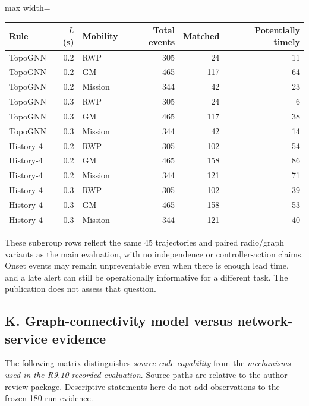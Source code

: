 \documentclass[10pt,a4paper]{article}
\begin{document}
\begin{center}
\small
\setlength{\tabcolsep}{5pt}
\begin{adjustbox}{max width=\linewidth}\begin{tabular}{lrlrrr}
\toprule
Rule & $L$ (s) & Mobility & Total events & Matched & Potentially timely \\
\midrule
TopoGNN & 0.2 & RWP & 305 & 24 & 11 \\
TopoGNN & 0.2 & GM & 465 & 117 & 64 \\
TopoGNN & 0.2 & Mission & 344 & 42 & 23 \\
TopoGNN & 0.3 & RWP & 305 & 24 & 6 \\
TopoGNN & 0.3 & GM & 465 & 117 & 38 \\
TopoGNN & 0.3 & Mission & 344 & 42 & 14 \\
History-4 & 0.2 & RWP & 305 & 102 & 54 \\
History-4 & 0.2 & GM & 465 & 158 & 86 \\
History-4 & 0.2 & Mission & 344 & 121 & 71 \\
History-4 & 0.3 & RWP & 305 & 102 & 39 \\
History-4 & 0.3 & GM & 465 & 158 & 53 \\
History-4 & 0.3 & Mission & 344 & 121 & 40 \\
\bottomrule
\end{tabular}\end{adjustbox}
\end{center}

\noindent These subgroup rows reflect the same 45 trajectories and paired radio/graph variants as the main evaluation, with no independence or controller-action claims. Onset events may remain unpreventable even when there is enough lead time, and a late alert can still be operationally informative for a different task. The publication does not assess that question.


\newpage
\subsection*{K. Graph-connectivity model versus network-service evidence}
\noindent The following matrix distinguishes \emph{source code capability} from the \emph{mechanisms used in the R9.10 recorded evaluation}. Source paths are relative to the author-review package. Descriptive statements here do not add observations to the frozen 180-run evidence.
\end{document}
